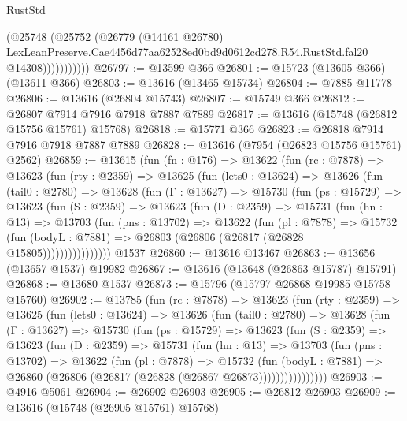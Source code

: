 \begin{lexlean}{RustStd}
\begin{coremodule}
                    (@25748
                      (@25752
                        (@26779
                          (@14161 @26780)
                          LexLeanPreserve.Cae4456d77aa62528ed0bd9d0612cd278.R54.RustStd.fal20
                          @14308)))))))))))
@26797 := @13599 @366
@26801 := @15723 (@13605 @366) (@13611 @366)
@26803 := @13616 (@13465 @15734)
@26804 := @7885 @11778
@26806 := @13616 (@26804 @15743)
@26807 := @15749 @366
@26812 := @26807 @7914 @7916 @7918 @7887 @7889
@26817 := @13616 (@15748 (@26812 @15756 @15761) @15768)
@26818 := @15771 @366
@26823 := @26818 @7914 @7916 @7918 @7887 @7889
@26828 := @13616 (@7954 (@26823 @15756 @15761) @2562)
@26859 := @13615
    (fun (fn : @176) =>
    @13622
      (fun (rc : @7878) =>
      @13623
        (fun (rty : @2359) =>
        @13625
          (fun (lets0 : @13624) =>
          @13626
            (fun (tail0 : @2780) =>
            @13628
              (fun (Γ : @13627) =>
              @15730
                (fun (ps : @15729) =>
                @13623
                  (fun (S : @2359) =>
                  @13623
                    (fun (D : @2359) =>
                    @15731
                      (fun (hn : @13) =>
                      @13703
                        (fun (pns : @13702) =>
                        @13622
                          (fun (pl : @7878) =>
                          @15732
                            (fun (bodyL : @7881) =>
                            @26803 (@26806 (@26817 (@26828 @15805))))))))))))))))
    @1537
@26860 := @13616 @13467
@26863 := @13656 (@13657 @1537) @19982
@26867 := @13616 (@13648 (@26863 @15787) @15791)
@26868 := @13680 @1537
@26873 := @15796 (@15797 @26868 @19985 @15758 @15760)
@26902 := @13785
    (fun (rc : @7878) =>
    @13623
      (fun (rty : @2359) =>
      @13625
        (fun (lets0 : @13624) =>
        @13626
          (fun (tail0 : @2780) =>
          @13628
            (fun (Γ : @13627) =>
            @15730
              (fun (ps : @15729) =>
              @13623
                (fun (S : @2359) =>
                @13623
                  (fun (D : @2359) =>
                  @15731
                    (fun (hn : @13) =>
                    @13703
                      (fun (pns : @13702) =>
                      @13622
                        (fun (pl : @7878) =>
                        @15732
                          (fun (bodyL : @7881) =>
                          @26860 (@26806 (@26817 (@26828 (@26867 @26873))))))))))))))))
@26903 := @4916 @5061
@26904 := @26902 @26903
@26905 := @26812 @26903
@26909 := @13616 (@15748 (@26905 @15761) @15768)

\end{coremodule}
\end{lexlean}
